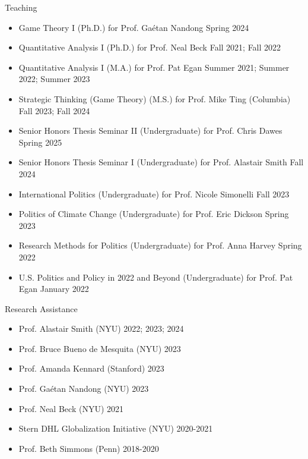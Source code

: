 \documentclass{resume} %
\begin{document}
\begin{rSection}{Teaching}
\begin{itemize}
\item Game Theory I (Ph.D.) for Prof. Ga\'etan Nandong \hfill Spring 2024
\item Quantitative Analysis I (Ph.D.) for Prof. Neal Beck \hfill Fall 2021; Fall 2022
\item Quantitative Analysis I (M.A.) for Prof. Pat Egan \hfill Summer 2021; Summer 2022; Summer 2023
\item Strategic Thinking (Game Theory) (M.S.) for Prof. Mike Ting (Columbia) \hfill Fall 2023; Fall 2024
\item Senior Honors Thesis Seminar II (Undergraduate) for Prof. Chris Dawes \hfill Spring 2025
\item Senior Honors Thesis Seminar I (Undergraduate) for Prof. Alastair Smith \hfill Fall 2024
\item International Politics (Undergraduate) for Prof. Nicole Simonelli \hfill Fall 2023
\item Politics of Climate Change (Undergraduate) for Prof. Eric Dickson \hfill Spring 2023
\item Research Methods for Politics (Undergraduate) for Prof. Anna Harvey \hfill Spring 2022
\item U.S. Politics and Policy in 2022 and Beyond (Undergraduate) for Prof. Pat Egan \hfill January 2022
\end{itemize}
\end{rSection}

\begin{rSection}{Research Assistance}
\begin{itemize}
    \item Prof. Alastair Smith (NYU) \hfill 2022; 2023; 2024
    \item Prof. Bruce Bueno de Mesquita (NYU) \hfill 2023
   \item  Prof. Amanda Kennard (Stanford) \hfill 2023
    \item Prof. Ga\'etan Nandong (NYU) \hfill 2023
    \item Prof. Neal Beck (NYU) \hfill 2021
   \item  Stern DHL Globalization Initiative (NYU) \hfill 2020-2021
   \item  Prof. Beth Simmons (Penn) \hfill 2018-2020
    \end{itemize}
\end{rSection}
\end{document}
